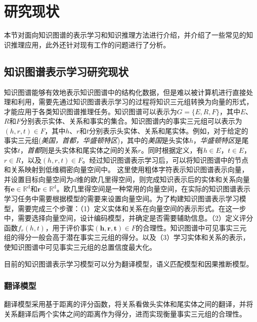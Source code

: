 \documentclass[algorithmlist, AutoFakeBold, AutoFakeSlant, figurelist, tablelist, nomlist, masters]{seuthesix}
\begin{document}
\section{研究现状}
本节对面向知识图谱的表示学习和知识推理方法进行介绍，并介绍了一些常见的知识推理应用，此外还针对现有工作的问题进行了分析。

\subsection{知识图谱表示学习研究现状}
知识图谱能够有效地表示知识图谱中的结构化数据，但是难以被计算机进行直接处理和利用，需要先通过知识图谱表示学习的过程将知识三元组转换为向量的形式，才能应用于各类知识图谱推理任务。知识图谱可以表示为$G=\{E, R, F\}$，其中$E$、$R$和$F$分别表示实体、关系和事实的集合。知识图谱内的事实三元组可以表示为$(h, r, t) \in F$，其中$h$、$r$和$t$分别表示头实体、关系和尾实体。例如，对于给定的事实三元组(\textit{美国，首都，华盛顿特区})，其中的\textit{美国}是头实体$h$，\textit{华盛顿特区}是尾实体$t$，\textit{首都}则是头实体和尾实体之间的关系$r$。同时根据定义，有$h \in E$，$t \in E$，$r \in R$，以及$(h, r, t) \in F$。经过知识图谱表示学习后，可以将知识图谱中的节点和关系映射到低维稠密向量空间中。
这里使用粗体字符表示知识图谱表示向量，并设置目标向量空间为$d$维的欧几里得空间，则完成知识表示后的实体和关系向量有$\bm{e} \in \mathbb{R}^{\mathrm{d}}$和$\bm{r} \in \mathbb{R}^{\mathrm{d}}$。欧几里得空间是一种常用的向量空间，在实际的知识图谱表示学习任务中需要根据模型的需要来设置向量空间。为了构建知识图谱表示学习模型，需要完成三个步骤：（1）定义实体和关系在向量空间的表示形式。在这一步中，需要选择向量空间，设计编码模型，并确定是否需要辅助信息。（2）定义评分函数$f_r(h, t)$，用于评价事实$\left(\bm{h}, \bm{r}, \bm{t}\right) \in F$的合理性。知识图谱中可见事实三元组的得分一般会高于潜在事实三元组的得分。以及（3）学习实体和关系的表示，使知识图谱中可见事实三元组的总置信度最大化。

目前的知识图谱表示学习模型可以分为翻译模型，语义匹配模型和因果推断模型。

\subsubsection{翻译模型}
翻译模型采用基于距离的评分函数，将关系看做头实体和尾实体之间的翻译，并将关系翻译后两个实体之间的距离作为得分，进而实现衡量事实三元组的合理性。
\end{document}
